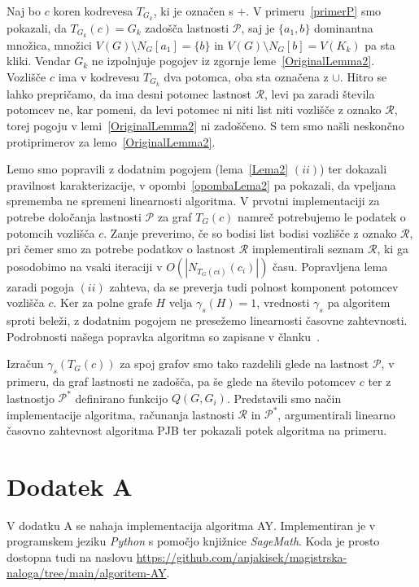\documentclass[12pt,a4paper,twoside]{article}
\theoremstyle{definition} %
\theoremstyle{plain} %
\numberwithin{equation}{section}  %
\begin{document}
Naj bo $c$ koren kodrevesa $T_{G_k}$, ki je označen s $+$. V primeru~\ref{primerP} smo pokazali, da $T_{G_k}(c) = G_k$ zadošča lastnosti $\mathcal{P}$, saj je $\{a_1, b\}$ dominantna množica, množici $V(G) \setminus N_G[a_1] = \{b\}$ in $V(G) \setminus N_G[b] = V(K_k)$ pa sta kliki. Vendar $G_k$ ne izpolnjuje pogojev iz zgornje leme~\ref{OriginalLemma2}. Vozlišče $c$ ima v kodrevesu $T_{G_k}$ dva potomca, oba sta označena z $\cup$. Hitro se lahko prepričamo, da ima desni potomec lastnost $\mathcal{R}$, levi pa zaradi števila potomcev ne, kar pomeni, da levi potomec ni niti list niti vozlišče z oznako $\mathcal{R}$, torej pogoju v lemi~\ref{OriginalLemma2} ni zadoščeno. S tem smo našli neskončno protiprimerov za lemo~\ref{OriginalLemma2}.

Lemo smo popravili z dodatnim pogojem (lema~\ref{Lema2} $(ii)$) ter dokazali pravilnost karakterizacije, v opombi~\ref{opombaLema2} pa pokazali, da vpeljana sprememba ne spremeni linearnosti algoritma. V prvotni implementaciji za potrebe določanja lastnosti $\mathcal{P}$ za graf $T_G(c)$ namreč potrebujemo le podatek o potomcih vozlišča $c$. Zanje preverimo, če so bodisi list bodisi vozlišče z oznako $\mathcal{R}$, pri čemer smo za potrebe podatkov o lastnost $\mathcal{R}$ implementirali seznam $\mathcal{R}$, ki ga posodobimo na vsaki iteraciji v $O(|N_{T_G(ci)}(c_i)|)$ času. Popravljena lema zaradi pogoja $(ii)$ zahteva, da se preverja tudi polnost komponent potomcev vozlišča $c$. Ker za polne grafe $H$ velja $\gamma_s(H) = 1$, vrednosti $\gamma_s$ pa algoritem sproti beleži, z dodatnim pogojem ne presežemo linearnosti časovne zahtevnosti. Podrobnosti našega popravka algoritma so zapisane v članku~\cite{kisek2020onJha}.

Izračun $\gamma_s(T_G(c))$ za spoj grafov smo tako razdelili glede na lastnost $\mathcal{P}$, v primeru, da graf lastnosti ne zadošča, pa še glede na število potomcev $c$ ter z lastnostjo $\mathcal{P^*}$ definirano funkcijo $Q(G, G_i)$. Predstavili smo način implementacije algoritma, računanja lastnosti $\mathcal{R}$ in $\mathcal{P^*}$, argumentirali linearno časovno zahtevnost algoritma PJB ter pokazali potek algoritma na primeru.
\vfill
\cleardoublepage     

\section*{Dodatek A}\label{sec:dodatekA}
V dodatku A se nahaja implementacija algoritma AY. Implementiran je v programskem jeziku \emph{Python} s pomočjo knjižnice \emph{SageMath}. Koda je prosto dostopna tudi na naslovu \url{https://github.com/anjakisek/magistrska-naloga/tree/main/algoritem-AY}.
\end{document}
